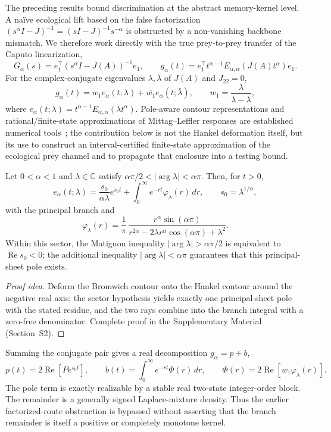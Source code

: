 The preceding results bound discrimination at the abstract memory-kernel level. A na\"ive ecological lift based on the false factorization $(s^\alpha I-J)^{-1}=(sI-J)^{-1}s^{-\alpha}$ is obstructed by a non-vanishing backbone mismatch. We therefore work directly with the true prey-to-prey transfer of the Caputo linearization,
\[
G_\alpha(s)=e_1^\top(s^\alpha I-J(A))^{-1}e_1,
\qquad
g_\alpha(t)=e_1^\top t^{\alpha-1}E_{\alpha,\alpha}(J(A)t^\alpha)e_1.
\]
For the complex-conjugate eigenvalues $\lambda,\bar\lambda$ of $J(A)$ and $J_{22}=0$,
\[
g_\alpha(t)=w_1e_\alpha(t;\lambda)+\overline{w_1}e_\alpha(t;\bar\lambda),
\qquad
w_1=\frac{\lambda}{\lambda-\bar\lambda},
\]
where $e_\alpha(t;\lambda)=t^{\alpha-1}E_{\alpha,\alpha}(\lambda t^\alpha)$. Pole-aware contour representations and rational/finite-state approximations of Mittag--Leffler responses are established numerical tools~\cite{F02,ML01}; the contribution below is not the Hankel deformation itself, but its use to construct an interval-certified finite-state approximation of the ecological prey channel and to propagate that enclosure into a testing bound.

\begin{lemma}
\label{lem:polebranch}
Let $0<\alpha<1$ and $\lambda\in\mathbb C$ satisfy $\alpha\pi/2<|\arg\lambda|<\alpha\pi$. Then, for $t>0$,
\[
e_\alpha(t;\lambda)=\frac{s_0}{\alpha\lambda}e^{s_0t}+\int_0^\infty e^{-rt}\varphi_\lambda(r)\,dr,
\qquad s_0=\lambda^{1/\alpha},
\]
with the principal branch and
\[
\varphi_\lambda(r)=\frac{1}{\pi}\,
\frac{r^\alpha\sin(\alpha\pi)}{r^{2\alpha}-2\lambda r^\alpha\cos(\alpha\pi)+\lambda^2}.
\]
Within this sector, the Matignon inequality $|\arg\lambda|>\alpha\pi/2$ is equivalent to $\operatorname{Re}s_0<0$; the additional inequality $|\arg\lambda|<\alpha\pi$ guarantees that this principal-sheet pole exists.
\end{lemma}
\begin{proof}[Proof idea]
Deform the Bromwich contour onto the Hankel contour around the negative real axis; the sector hypothesis yields exactly one principal-sheet pole with the stated residue, and the two rays combine into the branch integral with a zero-free denominator. Complete proof in the Supplementary Material (Section~S2).
\end{proof}

Summing the conjugate pair gives a real decomposition $g_\alpha=p+b$,
\[
p(t)=2\operatorname{Re}[Pe^{s_0t}],\qquad
b(t)=\int_0^\infty e^{-rt}\Phi(r)\,dr,
\qquad
\Phi(r)=2\operatorname{Re}[w_1\varphi_\lambda(r)].
\]
The pole term is exactly realizable by a stable real two-state integer-order block. The remainder is a generally signed Laplace-mixture density. Thus the earlier factorized-route obstruction is bypassed without asserting that the branch remainder is itself a positive or completely monotone kernel.

